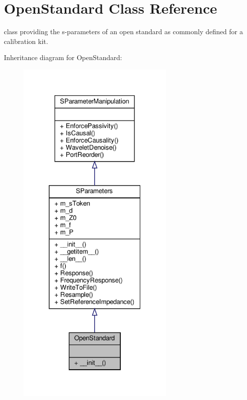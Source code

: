 \hypertarget{classSignalIntegrity_1_1Measurement_1_1CalKit_1_1Standards_1_1OpenStandard_1_1OpenStandard}{}\section{Open\+Standard Class Reference}
\label{classSignalIntegrity_1_1Measurement_1_1CalKit_1_1Standards_1_1OpenStandard_1_1OpenStandard}


class providing the s-\/parameters of an open standard as commonly defined for a calibration kit.  




Inheritance diagram for Open\+Standard\+:\nopagebreak
\begin{figure}[H]
\begin{center}
\leavevmode
\includegraphics[width=220pt]{classSignalIntegrity_1_1Measurement_1_1CalKit_1_1Standards_1_1OpenStandard_1_1OpenStandard__inherit__graph}
\end{center}
\end{figure}


